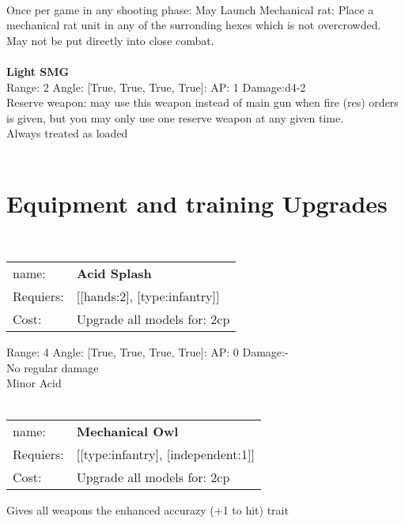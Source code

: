 \ \\
Once per game in any shooting phase: May Launch Mechanical rat: Place a mechanical rat unit in any of the surronding hexes which is not overcrowded. May not be put directly into close combat. \\ 

\ \\
{\bf Light SMG } \\



Range: 2  Angle: [True, True, True, True]: AP: 1 Damage:d4-2 \\
Reserve weapon: may use this weapon instead of main gun when fire (res) orders is given, but you may only use one reserve weapon at any given time.\\ 
Always treated as loaded\\ 




 
\ \\

\section{Equipment and training Upgrades}\ \\
\begin{tabular}{ll}
name: & {\bf Acid Splash } \\
Requiers: & [[hands:2], [type:infantry]] \\
Cost: & Upgrade all models for: 2cp \\
\end{tabular}



Range: 4  Angle: [True, True, True, True]: AP: 0 Damage:- \\
No regular damage\\ 
Minor Acid\\ 








\ \\
\begin{tabular}{ll}
name: & {\bf Mechanical Owl } \\
Requiers: & [[type:infantry], [independent:1]] \\
Cost: & Upgrade all models for: 2cp \\
\end{tabular}

Gives all weapons the enhanced accurazy (+1 to hit) trait\\ 









